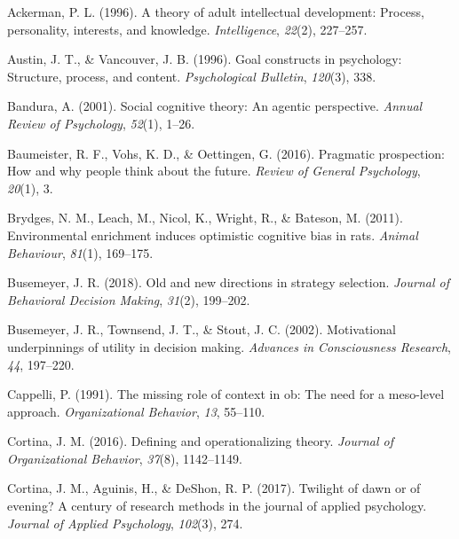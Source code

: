 \documentclass[english,,man]{apa6}
\theoremstyle{definition}
\theoremstyle{definition}
\theoremstyle{definition}
\theoremstyle{remark}
\begin{document}
\setlength{\parindent}{-0.5in}
\setlength{\leftskip}{0.5in}

\hypertarget{refs}{}
\leavevmode\hypertarget{ref-ackerman1996}{}%
Ackerman, P. L. (1996). A theory of adult intellectual development:
Process, personality, interests, and knowledge. \emph{Intelligence},
\emph{22}(2), 227--257.

\leavevmode\hypertarget{ref-austin1996}{}%
Austin, J. T., \& Vancouver, J. B. (1996). Goal constructs in
psychology: Structure, process, and content. \emph{Psychological
Bulletin}, \emph{120}(3), 338.

\leavevmode\hypertarget{ref-bandura2001}{}%
Bandura, A. (2001). Social cognitive theory: An agentic perspective.
\emph{Annual Review of Psychology}, \emph{52}(1), 1--26.

\leavevmode\hypertarget{ref-baumeister2016}{}%
Baumeister, R. F., Vohs, K. D., \& Oettingen, G. (2016). Pragmatic
prospection: How and why people think about the future. \emph{Review of
General Psychology}, \emph{20}(1), 3.

\leavevmode\hypertarget{ref-brydges2011}{}%
Brydges, N. M., Leach, M., Nicol, K., Wright, R., \& Bateson, M. (2011).
Environmental enrichment induces optimistic cognitive bias in rats.
\emph{Animal Behaviour}, \emph{81}(1), 169--175.

\leavevmode\hypertarget{ref-busemeyer2018}{}%
Busemeyer, J. R. (2018). Old and new directions in strategy selection.
\emph{Journal of Behavioral Decision Making}, \emph{31}(2), 199--202.

\leavevmode\hypertarget{ref-busemeyer2002}{}%
Busemeyer, J. R., Townsend, J. T., \& Stout, J. C. (2002). Motivational
underpinnings of utility in decision making. \emph{Advances in
Consciousness Research}, \emph{44}, 197--220.

\leavevmode\hypertarget{ref-cappelli1991}{}%
Cappelli, P. (1991). The missing role of context in ob: The need for a
meso-level approach. \emph{Organizational Behavior}, \emph{13}, 55--110.

\leavevmode\hypertarget{ref-Cortina2016}{}%
Cortina, J. M. (2016). Defining and operationalizing theory.
\emph{Journal of Organizational Behavior}, \emph{37}(8), 1142--1149.

\leavevmode\hypertarget{ref-Cortina2017}{}%
Cortina, J. M., Aguinis, H., \& DeShon, R. P. (2017). Twilight of dawn
or of evening? A century of research methods in the journal of applied
psychology. \emph{Journal of Applied Psychology}, \emph{102}(3), 274.
\end{document}
